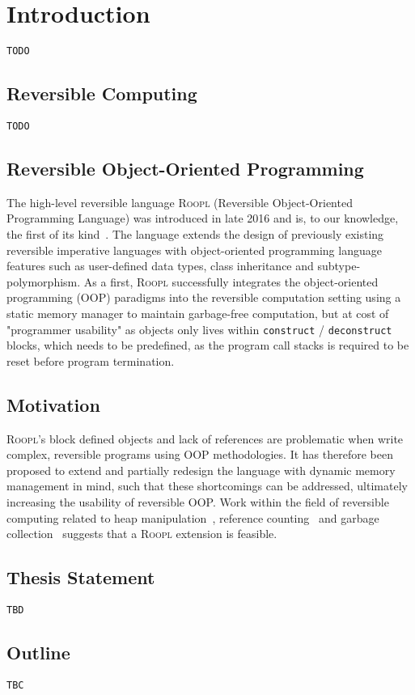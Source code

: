 \chapter{Introduction}
\texttt{TODO}

\section{Reversible Computing}
\texttt{TODO}

\section{Reversible Object-Oriented Programming}
The high-level reversible language \textsc{Roopl} (Reversible Object-Oriented Programming Language) was introduced in late 2016 and is, to our knowledge, the first of its kind~\cite{th:roopl}. The language extends the design of previously existing reversible imperative languages with object-oriented programming language features such as user-defined data types, class inheritance and subtype-polymorphism. As a first, \textsc{Roopl} successfully integrates the object-oriented programming (OOP) paradigms into the reversible computation setting using a static memory manager to maintain garbage-free computation, but at cost of "programmer usability" as objects only lives within \texttt{construct} / \texttt{deconstruct} blocks, which needs to be predefined, as the program call stacks is required to be reset before program termination.

\section{Motivation}
\textsc{Roopl}'s block defined objects and lack of references are problematic when write complex, reversible programs using OOP methodologies. It has therefore been proposed to extend and partially redesign the language with dynamic memory management in mind, such that these shortcomings can be addressed, ultimately increasing the usability of reversible OOP. Work within the field of reversible computing related to heap manipulation~\cite{ha:heap}, reference counting~\cite{tm:refcounting} and garbage collection~\cite{tm:garbage} suggests that a \textsc{Roopl} extension is feasible.



\section{Thesis Statement}
\texttt{TBD}

\section{Outline}
\texttt{TBC}